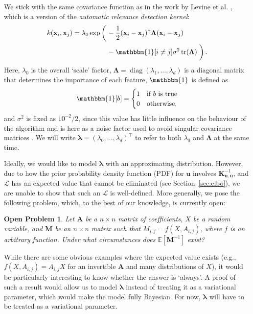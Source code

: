 \documentclass{mpaper}
\newtheorem{problem}[theorem]{Open Problem}
\DeclareMathOperator{\diag}{diag}
\DeclareMathOperator{\tr}{tr}
\newcommand{\Kuu}{\mathbf{K}_{\mathbf{u},\mathbf{u}}}
\begin{document}
We stick with the same covariance function as in the work by Levine et al.
\cite{DBLP:conf/nips/LevinePK11}, which is a version of the \emph{automatic
  relevance detection kernel}:
\begin{align*}
  k(\mathbf{x}_i, \mathbf{x}_j) = \lambda_0\exp\left( \vphantom{\frac{1}{2}} \right. &-\frac{1}{2}(\mathbf{x}_i - \mathbf{x}_j)^\intercal\bm\Lambda(\mathbf{x}_i - \mathbf{x}_j) \\
                                                                                     &- \mathbbm{1}[i \ne j]\sigma^2\tr(\bm\Lambda) \left. \vphantom{\frac{1}{2}} \right).
\end{align*}
Here, $\lambda_0$ is the overall `scale' factor, $\bm\Lambda = \diag(\lambda_1,
\dots, \lambda_d)$ is a diagonal matrix that determines the importance of each
feature, $\mathbbm{1}$ is defined as
\[
  \mathbbm{1}[b] = \begin{cases}
    1 & \mbox{if $b$ is true} \\
    0 & \mbox{otherwise},
  \end{cases}
\]
and $\sigma^2$ is fixed as $10^{-2}/2$, since this value has little influence on
the behaviour of the algorithm and is here as a noise factor used to avoid
singular covariance matrices \cite{DBLP:conf/nips/LevinePK11}. We will write
$\bm\lambda = (\lambda_0, \dots, \lambda_d)^\intercal$ to refer to both
$\lambda_0$ and $\bm\Lambda$ at the same time.

Ideally, we would like to model $\bm\lambda$ with an approximating distribution.
However, due to how the prior probability density function (PDF) for
$\mathbf{u}$ involves $\Kuu^{-1}$, and $\mathcal{L}$ has an expected value that
cannot be eliminated (see Section~\ref{sec:elbo}), we are unable to show that
such an $\mathcal{L}$ is well-defined. More generally, we pose the following
problem, which, to the best of our knowledge, is currently open:
\begin{problem}
  Let $\mathbf{A}$ be a $n \times n$ matrix of coefficients, $X$ be a random
  variable, and $\mathbf{M}$ be an $n \times n$ matrix such that $M_{i,j} = f(X,
  A_{i,j})$, where $f$ is an arbitrary function. Under what circumstances does
  $\mathbb{E}[\mathbf{M}^{-1}]$ exist?
\end{problem}
While there are some obvious examples where the expected value exists (e.g.,
$f(X, A_{i,j}) = A_{i,j}X$ for an invertible $\mathbf{A}$ and many distributions
of $X$), it would be particularly interesting to know whether the answer is
`always'. A proof of such a result would allow us to model $\bm\lambda$ instead
of treating it as a variational parameter, which would make the model fully
Bayesian. For now, $\bm\lambda$ will have to be treated as a variational
parameter.
\end{document}

